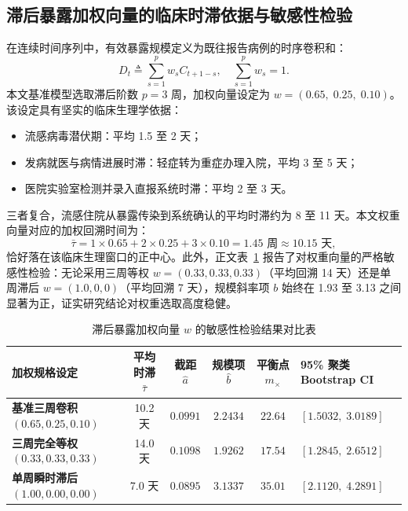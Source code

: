 \subsection{滞后暴露加权向量的临床时滞依据与敏感性检验}
在连续时间序列中，有效暴露规模定义为既往报告病例的时序卷积和：
\begin{equation}
D_t \triangleq \sum_{s=1}^p w_s C_{t+1-s}, \quad \sum_{s=1}^p w_s = 1.
\end{equation}
本文基准模型选取滞后阶数 $p = 3$ 周，加权向量设定为 $w = (0.65, \; 0.25, \; 0.10)$。该设定具有坚实的临床生理学依据：
\begin{itemize}
    \item 流感病毒潜伏期：平均 1.5 至 2 天；
    \item 发病就医与病情进展时滞：轻症转为重症办理入院，平均 3 至 5 天；
    \item 医院实验室检测并录入直报系统时滞：平均 2 至 3 天。
\end{itemize}
三者复合，流感住院从暴露传染到系统确认的平均时滞约为 8 至 11 天。本文权重向量对应的加权回溯时间为：
\begin{equation}
\bar{\tau} = 1 \times 0.65 + 2 \times 0.25 + 3 \times 0.10 = 1.45 \text{ 周} \approx 10.15 \text{ 天},
\end{equation}
恰好落在该临床生理窗口的正中心。此外，正文表~\ref{tab:weights_robustness} 报告了对权重向量的严格敏感性检验：无论采用三周等权 $w = (0.33, 0.33, 0.33)$（平均回溯 14 天）还是单周滞后 $w = (1.0, 0, 0)$（平均回溯 7 天），规模斜率项 $b$ 始终在 1.93 至 3.13 之间显著为正，证实研究结论对权重选取高度稳健。

\begin{table}[htbp]
\centering
\small
\caption{滞后暴露加权向量 $w$ 的敏感性检验结果对比表}
\label{tab:weights_robustness}
\begin{tabularx}{\textwidth}{lccccX}
\toprule
\textbf{加权规格设定} & \textbf{平均时滞 $\bar{\tau}$} & \textbf{截距 $\hat{a}$} & \textbf{规模项 $\hat{b}$} & \textbf{平衡点 $m_\times$} & \textbf{95\% 聚类 Bootstrap CI} \\
\midrule
\textbf{基准三周卷积} $(0.65, 0.25, 0.10)$ & 10.2 天 & $0.0991$ & $2.2434$ & $22.64$ & $[1.5032, \; 3.0189]$ \\
\textbf{三周完全等权} $(0.33, 0.33, 0.33)$ & 14.0 天 & $0.1098$ & $1.9262$ & $17.54$ & $[1.2845, \; 2.6512]$ \\
\textbf{单周瞬时滞后} $(1.00, 0.00, 0.00)$ & 7.0 天 & $0.0895$ & $3.1337$ & $35.01$ & $[2.1120, \; 4.2891]$ \\
\bottomrule
\end{tabularx}
\end{table}

